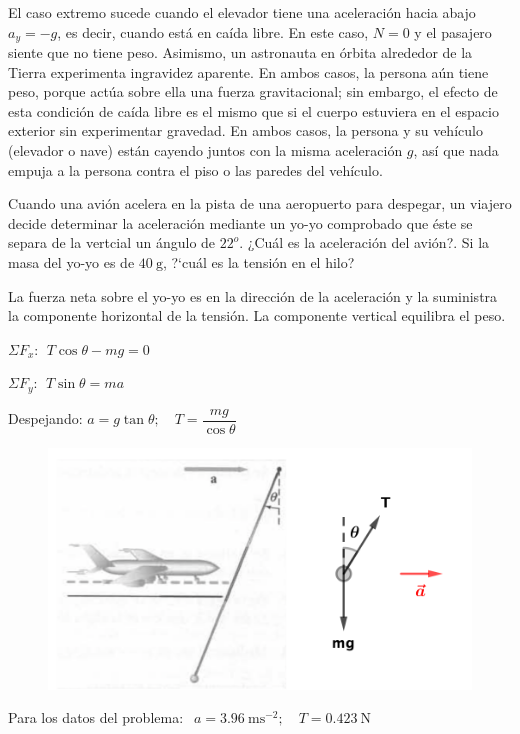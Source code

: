 \footnotesize{\textsf{El caso extremo sucede cuando el elevador tiene una aceleración hacia abajo  $a_y=-g$, es decir, cuando está en caída libre. En este caso, $N=0$  y el pasajero siente que no tiene peso. Asimismo, un astronauta en órbita alrededor de la Tierra experimenta ingravidez aparente. En ambos casos, la persona aún tiene peso, porque actúa sobre ella una fuerza gravitacional; sin embargo, el efecto de esta condición de caída libre es el mismo que si el cuerpo estuviera en el espacio exterior sin experimentar gravedad. En ambos casos, la persona y su vehículo (elevador o nave) están cayendo juntos con la misma aceleración $g$, así que nada empuja a la persona contra el piso o las paredes del vehículo}}\normalsize{.}

\begin{prob}
Cuando una avión acelera en la pista de una aeropuerto para despegar, un viajero decide determinar la aceleración mediante un yo-yo comprobado que éste se separa de la vertcial un ángulo de $22^o$. ¿Cuál es la aceleración del avión?. Si la masa del yo-yo es de $40\ \mathrm{g}$, ?`cuál es la tensión en el hilo?	
\end{prob}

\vspace{30mm} %

\begin{multicols}{2}
La fuerza neta sobre el yo-yo es en la dirección de la aceleración y la suministra la componente horizontal de la tensión. La componente vertical equilibra el peso.

$\Sigma F_x: \ \ T \cos \theta-mg=0$

$\Sigma F_y: \ \ T \sin \theta = m a$

Despejando:  
$a=g \tan \theta; \quad T=\dfrac{mg}{\cos \theta}$

\begin{figure}[H]
	\centering
	\includegraphics[width=.5\textwidth]{imagenes/imagenes03/T03IM64.png}
	\end{figure}
\end{multicols}	
Para los datos del problema:  
$\ \ a=3.96\ \mathrm{ms}^{-2}; \quad T=0.423\ \mathrm{N}$
	
